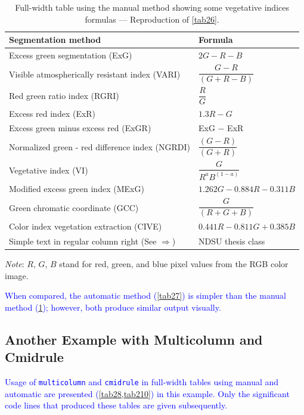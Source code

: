 \documentclass[phd,showframe]{ndsu-thesis-2022}
\newcommand\italk[1]{\textcolor{blue}{#1}}  %
\newcommand\vb[1]{\textcolor{blue}{\texttt{#1}}}%
\begin{document}
\begin{table}[t]
\caption{Full-width table using the manual method showing some vegetative indices formulas --- Reproduction of \cref{tab26}.}
\setlength{\tabcolsep}{7ex}
\begin{tabular}{@{\:}l l@{\:}}
\toprule
Segmentation method  & Formula  \\
\midrule
Excess green segmentation (ExG)    				& $2G - R - B$\\[1ex]
Visible atmospherically resistant index (VARI) 		& $\dfrac{{G - R}}
{(G + R - B)}$ \\[2ex]
Red green ratio index (RGRI) 					& $\dfrac{R}{G}$\\[2ex]
Excess red index (ExR) 						& $1.3R - G$\\[2ex]
Excess green minus excess red (ExGR) 			& \text ExG $-$ ExR\\[2ex]
Normalized green - red difference index (NGRDI)	& $\dfrac{(G - R)}{(G + R)}$\\[2ex]
Vegetative index (VI) 						& $\dfrac{G}{R^a B^{(1-a)}}$\\[3ex]
Modified excess green index (MExG) 			& $ 1.262G - 0.884R - 0.311B$\\[2ex]
Green chromatic coordinate (GCC) 				& $\dfrac{G}{(R + G + B)}$\\[2ex]
Color index vegetation extraction (CIVE) 			& $0.441R - 0.811G + 0.385B$\\[2ex]
Simple text in regular column right (See $\Rightarrow$) & NDSU thesis class\\
\bottomrule
\end{tabular}
\begin{tablenotes}[flushleft]
\footnotesize
\item \hspace{-1ex} \emph{Note}: $R$, $G$, $B$ stand for red, green, and blue pixel values from the RGB color image.
\label{tab28}
\end{tablenotes}
\end{table}

\italk{When compared, the automatic method (\cref{tab27}) is simpler than the manual method (\cref{tab28}); however, both produce similar output visually.} 

\kant[9]
\subsection{Another Example with Multicolumn and Cmidrule}
\italk{Usage of \vb{multicolumn} and \vb{cmidrule} in full-width tables using manual and automatic are presented (\cref{tab28,tab210}) in this example. Only the significant code lines that produced these tables are given subsequently.} 
\end{document}
